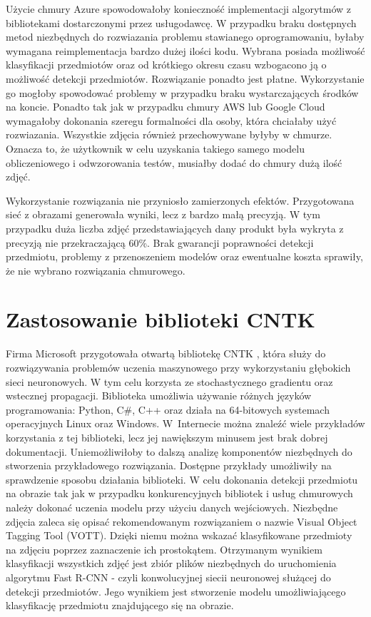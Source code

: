 {Użycie chmury Azure spowodowałoby konieczność implementacji algorytmów z bibliotekami dostarczonymi przez usługodawcę. W przypadku braku dostępnych metod niezbędnych do rozwiazania problemu stawianego oprogramowaniu, byłaby wymagana reimplementacja bardzo dużej ilości kodu. Wybrana posiada możliwość klasyfikacji przedmiotów oraz od krótkiego okresu czasu wzbogacono ją o możliwość detekcji przedmiotów. Rozwiązanie ponadto jest płatne. Wykorzystanie go mogłoby spowodować problemy w przypadku braku wystarczających środków na koncie. Ponadto tak jak w przypadku chmury AWS lub Google Cloud wymagałoby dokonania szeregu formalności dla osoby, która chciałaby użyć rozwiazania. Wszystkie zdjęcia również przechowywane byłyby w chmurze. Oznacza to, że użytkownik w celu uzyskania takiego samego modelu obliczeniowego i odwzorowania testów, musiałby dodać do chmury dużą ilość zdjęć. 

Wykorzystanie rozwiązania nie przyniosło zamierzonych efektów. Przygotowana sieć z obrazami generowała wyniki, lecz z bardzo małą precyzją. W tym przypadku duża liczba zdjęć przedstawiających dany produkt była wykryta z precyzją nie przekraczającą 60\%. Brak gwarancji poprawności detekcji przedmiotu, problemy z przenoszeniem modelów oraz ewentualne koszta sprawiły, że nie wybrano rozwiązania chmurowego.

\section{Zastosowanie biblioteki CNTK}{
Firma Microsoft przygotowała otwartą bibliotekę CNTK \cite{CNTK}, która służy do rozwiązywania problemów uczenia maszynowego przy wykorzystaniu głębokich sieci neuronowych. W tym celu korzysta ze stochastycznego gradientu oraz wstecznej propagacji. Biblioteka umożliwia używanie różnych języków programowania: Python, C\#, C++ oraz działa na 64-bitowych systemach operacyjnych Linux oraz Windows. W~Internecie można znaleźć wiele przykładów korzystania z tej biblioteki, lecz jej nawiększym minusem jest brak dobrej dokumentacji. Uniemożliwiłoby to dalszą analizę komponentów niezbędnych do stworzenia przykładowego rozwiązania. Dostępne przykłady umożliwiły na sprawdzenie sposobu działania biblioteki. W celu dokonania detekcji przedmiotu na obrazie tak jak w przypadku konkurencyjnych bibliotek i usług chmurowych należy dokonać uczenia modelu przy użyciu danych wejściowych. Niezbędne zdjęcia zaleca się opisać rekomendowanym rozwiązaniem o nazwie Visual Object Tagging Tool (VOTT)\cite{VOTT}. Dzięki niemu można wskazać klasyfikowane przedmioty na zdjęciu poprzez zaznaczenie ich prostokątem. Otrzymanym wynikiem klasyfikacji wszystkich zdjęć jest zbiór plików niezbędnych do uruchomienia algorytmu Fast R-CNN - czyli konwolucyjnej siecii neuronowej służącej do detekcji przedmiotów. Jego wynikiem jest stworzenie modelu umożliwiającego klasyfikację przedmiotu znajdującego się na obrazie. 

}}
